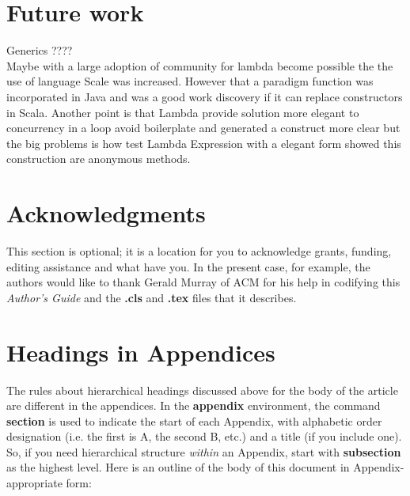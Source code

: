 \documentclass{sig-alternate-05-2015}
\begin{document}
\section{Future work}
Generics ????\\

Maybe with a large adoption of community for lambda become possible the the use of language Scale was increased. However that a paradigm function was incorporated in Java and was a good work discovery if it can replace constructors in Scala. Another point is that Lambda provide solution more elegant to concurrency in a loop avoid boilerplate and generated a construct more clear but the big problems is how test Lambda Expression with a elegant form showed this construction are anonymous methods. \\



\section{Acknowledgments}
This section is optional; it is a location for you
to acknowledge grants, funding, editing assistance and
what have you.  In the present case, for example, the
authors would like to thank Gerald Murray of ACM for
his help in codifying this \textit{Author's Guide}
and the \textbf{.cls} and \textbf{.tex} files that it describes.

%

%
%
\appendix
\section{Headings in Appendices}
The rules about hierarchical headings discussed above for
the body of the article are different in the appendices.
In the \textbf{appendix} environment, the command
\textbf{section} is used to
indicate the start of each Appendix, with alphabetic order
designation (i.e. the first is A, the second B, etc.) and
a title (if you include one).  So, if you need
hierarchical structure
\textit{within} an Appendix, start with \textbf{subsection} as the
highest level. Here is an outline of the body of this
document in Appendix-appropriate form:
\end{document}
